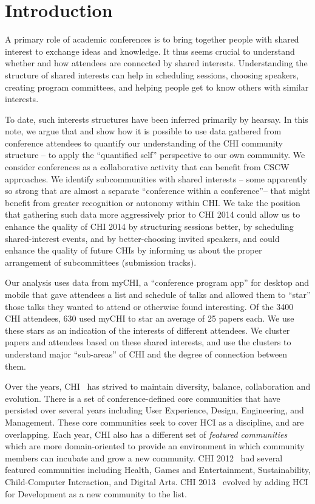 \documentclass{sigchi}
\begin{document}

\section{Introduction}
A primary role of academic conferences is to bring together people with shared interest to exchange ideas and knowledge.  It thus seems crucial to understand whether and how attendees are connected by shared interests.  Understanding the structure of shared interests can help in scheduling sessions, choosing speakers, creating program committees, and helping people get to know others with similar interests.  

To date, such interests structures have been inferred primarily by hearsay.  In this note, we argue that and show how it is possible to use data gathered from conference attendees to quantify our understanding of the CHI community structure -- to apply the “quantified self” perspective to our own community.  We consider conferences as a collaborative activity that can benefit from CSCW approaches.   We identify subcommunities with shared interests -- some apparently so strong that are almost a separate “conference within a conference”-- that might benefit from greater recognition or autonomy within CHI.  We take the position that gathering such data more aggressively prior to CHI 2014 could allow us to enhance the quality of CHI 2014 by structuring sessions better, by scheduling shared-interest events, and by better-choosing invited speakers, and could enhance the quality of future CHIs by informing us about the proper arrangement of subcommittees (submission tracks).

Our analysis uses data from myCHI, a “conference program app” for desktop and mobile that gave attendees a list and schedule of talks and allowed them to “star” those talks they wanted to attend or otherwise found interesting.  Of the 3400 CHI attendees, 630 used myCHI to star an average of 25 papers each.  We use these stars as an indication of the interests of different attendees.  We cluster papers and attendees based on these shared interests, and use the clusters to understand major “sub-areas” of CHI and the degree of connection between them.

Over the years, CHI~\cite{chi2013} has strived to maintain diversity, balance, collaboration and evolution. There is a set of conference-defined core communities that have persisted over several years including User Experience, Design, Engineering, and Management. These core communities seek to cover HCI as a discipline, and are overlapping. Each year, CHI also has a different set of \emph{featured communities} which are more domain-oriented to provide an environment in which community members can incubate and grow a new community.  CHI 2012~\cite{chi2012} had several featured communities including Health, Games and Entertainment, Sustainability, Child-Computer Interaction, and Digital Arts. CHI 2013~\cite{chi2013} evolved by adding HCI for Development as a new community to the list.
\end{document}
